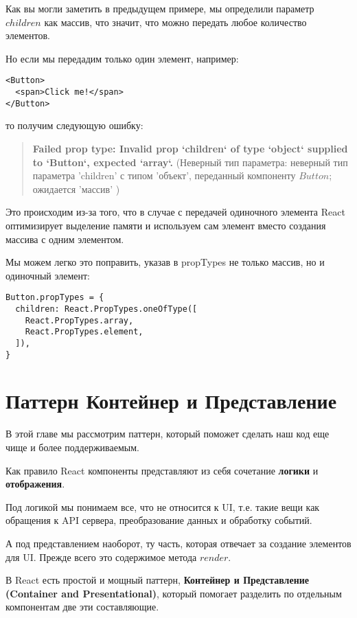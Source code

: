 Как вы могли заметить в предыдущем примере, мы определили параметр $children$ как массив, что значит, что можно передать любое количество элементов.

Но если мы передадим только один элемент, например:

\begin{lstlisting}
<Button>
  <span>Click me!</span>
</Button>
\end{lstlisting}

то получим следующую ошибку:

\begin{quote}
	\textbf{ Failed prop type: Invalid prop `children` of type `object` supplied to `Button`, expected `array`.} (Неверный тип параметра: неверный тип параметра 'children' с типом 'объект', переданный компоненту $Button$; ожидается 'массив' )
\end{quote}

Это происходим из-за того, что в случае с передачей одиночного элемента React оптимизирует выделение памяти и используем сам элемент вместо создания массива с одним элементом.

Мы можем легко это поправить, указав в propTypes не только массив, но и одиночный элемент:

\begin{lstlisting}
Button.propTypes = {
  children: React.PropTypes.oneOfType([
    React.PropTypes.array,
    React.PropTypes.element,
  ]),
}
\end{lstlisting}

\section{Паттерн Контейнер и Представление}

В этой главе мы рассмотрим паттерн, который поможет сделать наш код еще чище и более поддерживаемым.

Как правило React компоненты представляют из себя сочетание \textbf{логики} и \textbf{отображения}.

Под логикой мы понимаем все, что не относится к UI, т.е. такие вещи как обращения к API сервера, преобразование данных и обработку событий.

А под представлением наоборот, ту часть, которая отвечает за создание элементов для UI. Прежде всего это содержимое метода $render$.

В React есть простой и мощный паттерн, \textbf{Контейнер и Представление (Container and Presentational)}, который помогает разделить по отдельным компонентам две эти составляющие.

